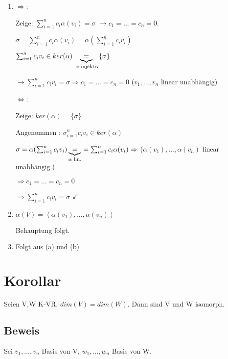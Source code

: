 \documentclass[a4paper, openany]{book}
\begin{document}
      \begin{enumerate}[label=(\alph*)]
        \item $\Rightarrow$:

        Zeige: $\sum_{i=1}^n c_i \alpha(v_i) = \sigma$ $\rightarrow c_1 = ... = c_n = 0$.

        $\sigma = \sum_{i=1}^n c_i \alpha(v_i) = \alpha(\sum_{i=1}^n c_i v_i)$

        \par \medskip

        $\sum_{i=1}^n c_i v_i \in ker(\alpha) \underbrace{=}_{\textnormal{ $\alpha$ injektiv}} \{\sigma\}$

        $\rightarrow \sum_{i=1}^n c_i v_i = \sigma \Rightarrow c_1 = ... = c_n = 0$ ($v_1, ..., v_n$ linear unabhängig)

        $\Leftrightarrow$:

        Zeige: $ker(\alpha) = \{\sigma\}$

        Angenommen : $\sigma_{i=1}^n c_i v_i \in ker(\alpha)$

        $\sigma = \alpha(\sum_{i=1}^n c_i v_i) \underbrace{=}_{\textnormal{$\alpha$ lin.}} = \sum_{i=1}^n c_i \alpha(v_i) \Rightarrow$ ($\alpha(v_1), ..., \alpha(v_n)$ linear unabhängig.)

        $\Rightarrow c_1 = ... = c_n = 0$

        $\Rightarrow \sum_{i=1}^n c_i v_i = \sigma$ $\checkmark$

        \item $\alpha(V) = \left \langle \alpha(v_1), ..., \alpha(v_n) \right \rangle$

        Behauptung folgt.

        \item Folgt aus (a) und (b)

      \end{enumerate}

        \section{Korollar}

        Seien V,W K-VR, $dim(V) = dim(W)$. Dann sind V und W isomorph.

        \subsection{Beweis}

        Sei $v_1, ..., v_n$ Basis von V, $w_1, ..., w_n$ Basis von W.
\end{document}
